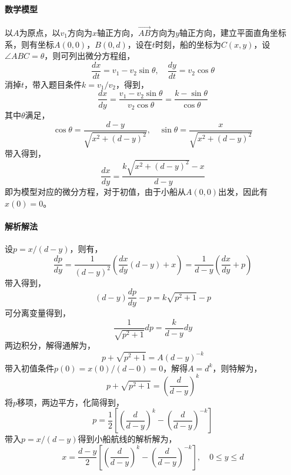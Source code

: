 \documentclass[12pt,a4paper]{article}
\begin{document}
\paragraph{数学模型} 以$A$为原点，以$v_1$方向为$x$轴正方向，$\overrightarrow{AB}$方向为$y$轴正方向，建立平面直角坐标系，则有坐标$A(0,0)$，$B(0,d)$，设在$t$时刻，船的坐标为$C(x,y)$，设$\angle ABC = \theta$，则可列出微分方程组，
\begin{equation}\label{eq:ex6_dxy_dt}
    \dfrac{dx}{dt} = v_1 - v_2 \sin \theta, \quad \dfrac{dy}{dt} = v_2 \cos \theta
\end{equation}
消掉$t$，带入题目条件$k=v_1/v_2$，得到，
\begin{equation}\label{eq:ex6_dy_dx}
    \frac{dx}{dy} = \frac{v_1 - v_2 \sin \theta}{v_2 \cos \theta} = \frac{k-\sin \theta}{\cos \theta}
\end{equation}
其中$\theta$满足，
\begin{equation}
    \cos \theta = \frac{d-y}{\sqrt{x^2 + (d-y)^2}}, \quad \sin \theta = \frac{x}{\sqrt{x^2 + (d-y)^2}}
\end{equation}
带入得到，
\begin{equation}\label{eq:ex6_model}
    \frac{dx}{dy} = \frac{k\sqrt{x^2 + (d-y)^2} - x}{d - y}
\end{equation}
即为模型对应的微分方程，对于初值，由于小船从$A(0,0)$出发，因此有$x(0) = 0$。

\paragraph{解析解法} 设$p = x/(d-y)$，则有，
\begin{equation}
    \frac{dp}{dy} = \frac{1}{(d-y)^2}\left(\frac{dx}{dy}(d-y)+x\right) = \frac{1}{d-y}\left(\frac{dx}{dy} + p\right)
\end{equation}
带入得到，
\begin{equation}
    (d-y)\frac{dp}{dy} - p = k\sqrt{p^2 + 1} - p
\end{equation}
可分离变量得到，
\begin{equation}
    \frac{1}{\sqrt{p^2 + 1}}dp = \frac{k}{d-y}dy
\end{equation}
两边积分，解得通解为，
\begin{equation}
    p + \sqrt{p^2 + 1} = A(d-y)^{-k}
\end{equation}
带入初值条件$p(0) = x(0)/(d-0) = 0$，解得$A=d^k$，则特解为，
\begin{equation}
    p + \sqrt{p^2 + 1} = \left(\frac{d}{d-y}\right)^k
\end{equation}
将$p$移项，两边平方，化简得到，
\begin{equation}
    p = \frac{1}{2}\left[\left(\frac{d}{d-y}\right)^k - \left(\frac{d}{d-y}\right)^{-k}\right]
\end{equation}
带入$p=x/(d-y)$得到小船航线的解析解为，
\begin{equation}
    x = \frac{d-y}{2}\left[\left(\frac{d}{d-y}\right)^k - \left(\frac{d}{d-y}\right)^{-k}\right], \quad 0\le y \le d
\end{equation}
\end{document}
